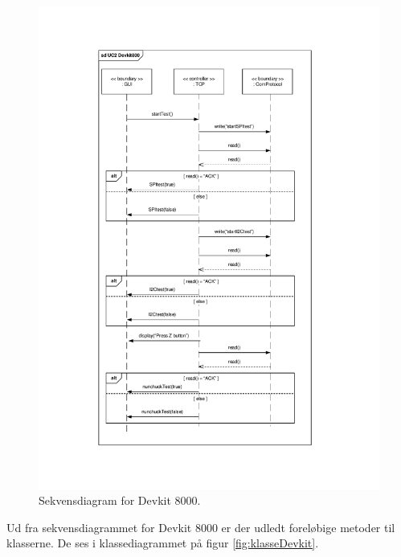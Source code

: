 \begin{figure}[H]
	\centering
	\includegraphics[trim = {3.6cm 2.7cm 4cm 2.7cm}, clip = true, width=\textwidth] {Systemarkitektur/images/SekvensdiagramDevkit.pdf}
	\caption{Sekvensdiagram for Devkit 8000.}
	\label{fig:sekvensDevkit}
\end{figure}
Ud fra sekvensdiagrammet for Devkit 8000 er der udledt foreløbige metoder til klasserne. De ses i klassediagrammet på figur \ref{fig:klasseDevkit}. 


